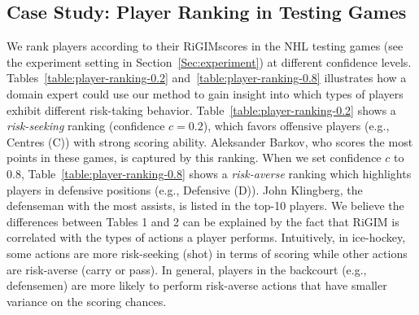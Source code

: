 \documentclass{article}
\newcommand{\confidence}{c}
\newcommand{\sys}{RiGIM}
\newcommand{\system}{\sys\;}
\begin{document}
\subsection{Case Study: Player Ranking in Testing Games}
We rank players according to their \system scores in the NHL testing games (see the experiment setting in Section~\ref{Sec:experiment}) at different confidence levels. 
Tables~\ref{table:player-ranking-0.2} and~\ref{table:player-ranking-0.8} illustrates how a domain expert could use our method to gain insight into which types of players exhibit different risk-taking behavior.
Table~\ref{table:player-ranking-0.2} shows a {\it risk-seeking} ranking (confidence $\confidence=0.2$),  which favors offensive players (e.g., Centres (C)) with strong scoring ability. Aleksander Barkov, who scores the most points in these games, is captured by this ranking. When we set confidence $\confidence$ to 0.8, Table~\ref{table:player-ranking-0.8} shows a {\it risk-averse} ranking which highlights players in defensive positions (e.g., Defensive (D)). John Klingberg, the defenseman with the most assists, is listed in the top-10 players. 
We believe the differences between Tables 1 and 2 can be explained by the fact that RiGIM is correlated with the types of actions a player performs. Intuitively, in ice-hockey, some actions are more risk-seeking (shot) in terms of scoring while other actions are risk-averse (carry or pass). In general, players in the backcourt (e.g., defensemen) are more likely to perform risk-averse actions that have smaller variance on the scoring chances.


\end{document}
